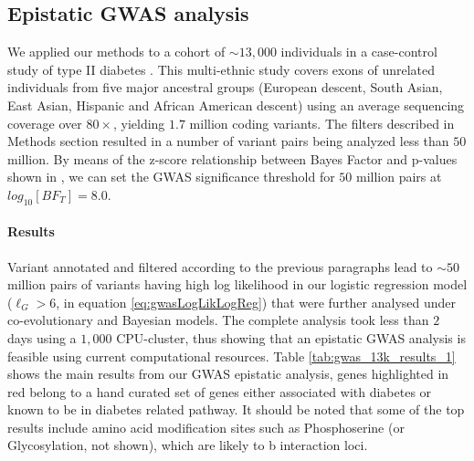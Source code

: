 \subsection{Epistatic GWAS analysis}

We applied our methods to a cohort of $\sim 13,000$ individuals in a case-control study of type II diabetes \cite{mccarthy2015T2D}.
This multi-ethnic study covers exons of unrelated individuals from five major ancestral groups (European descent, South Asian, East Asian, Hispanic and African American descent) using an average sequencing coverage over $80 \times$, yielding $1.7$ million coding variants. The filters described in Methods section resulted in a number of variant pairs being analyzed less than $50$ million. By means of the z-score relationship between Bayes Factor and p-values shown in \cite{goodman1999toward}, we can set the GWAS significance threshold for $50$ million pairs at $log_{10}[BF_T] =  8.0$.

\paragraph{Results} Variant annotated and filtered according to the previous paragraphs lead to $\sim 50$ million pairs of variants having high log likelihood in our logistic regression model  ($\ell_G > 6$, in equation \ref{eq:gwasLogLikLogReg}) that were further analysed under co-evolutionary and Bayesian models. The complete analysis took less than $2$ days using a $1,000$ CPU-cluster, thus showing that an epistatic GWAS analysis is feasible using current computational resources. Table \ref{tab:gwas_13k_results_1} shows the main results from our GWAS epistatic analysis, genes highlighted in red belong to a hand curated set of genes either associated with diabetes or known to be in diabetes related pathway. It should be noted that some of the top results include amino acid modification sites such as Phosphoserine (or Glycosylation, not shown), which are likely to b interaction loci.


